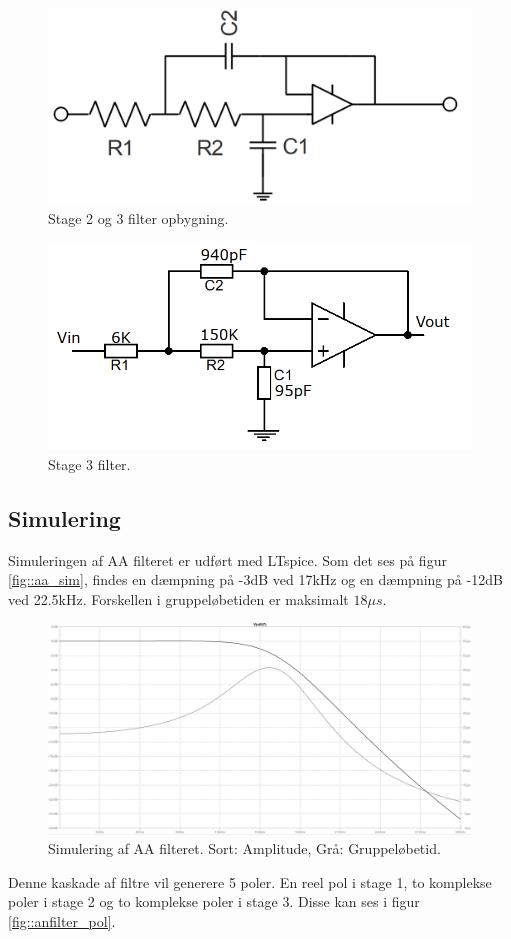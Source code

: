 \begin{figure}[h!]
	\centering
	\includegraphics[scale=0.3]{./billeder/stage23}
	\caption{Stage 2 og 3 filter opbygning.}
	\label{fig::filter_stage2}
\end{figure}
\FloatBlock

\begin{figure}[h!]
	\centering
	\includegraphics[scale=0.4]{./billeder/stage3}
	\caption{Stage 3 filter.}
	\label{fig::filter_stage3}
\end{figure}
\FloatBlock

\subsection{Simulering}
Simuleringen af AA filteret er udført med LTspice. Som det ses på figur \ref{fig::aa_sim}, findes en dæmpning på -3dB ved 17kHz og en dæmpning på -12dB ved 22.5kHz. Forskellen i gruppeløbetiden er maksimalt $18 \mu s$.
\begin{figure}[h!]
	\centering
	\includegraphics[scale=0.2]{./billeder/aa_sim1}
	\caption{Simulering af AA filteret. Sort: Amplitude, Grå: Gruppeløbetid.}
	\label{fig::afilter_aasim}
\end{figure}
\FloatBlock
Denne kaskade af filtre vil generere 5 poler. En reel pol i stage 1, to komplekse poler i stage 2 og to komplekse poler i stage 3. Disse kan ses i figur \ref{fig::anfilter_pol}.

